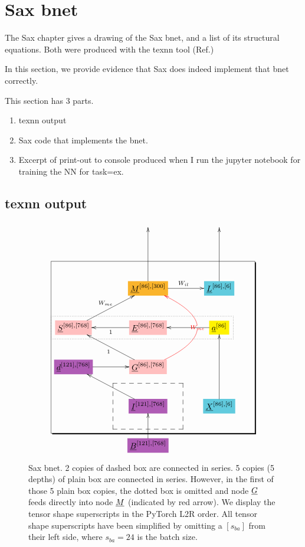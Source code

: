 \documentclass[12pt]{article}
\begin{document}
\section{Sax bnet}

The Sax chapter gives 
a drawing
of the Sax bnet,
and a list
of its structural
equations.
Both were produced with the texnn tool (Ref.\cite{texnn})

In this section,
we provide 
evidence that
 Sax
 does indeed implement
 that bnet correctly.

This section has 3 parts.

\begin{enumerate}

\item texnn output

\item Sax code
that implements the bnet.
\item Excerpt of print-out to console produced when I run
the jupyter notebook for training 
the NN for task=ex. 


\end{enumerate}

\subsection{texnn output}

\begin{figure}[h!]\centering
$$\xymatrix@R=2.5pc@C=3.5pc{
&&
\\
&&
\\
&*+[F*:Dandelion]{\underline{M}^{[86], [300]}}\ar[uu]\ar[r]^{W_{il}}&*+[F*:SkyBlue]{\underline{L}^{[86], [6]}}\ar[uu]
\\
*+[F*:pink]{\underline{S}^{[86], [768]}}\ar[ur]^{W_{me}}&*+[F*:pink]{\underline{E}^{[86], [768]}}\ar[l]^{1}&*+[F*:yellow]{\underline{a}^{[86]}}\ar[l]
\\
*+[F*:Orchid]{\underline{d}^{[121], [768]}}\ar[r]&*+[F*:pink]{\underline{G}^{[86], [768]}}\ar@[red]@/_5pc/[uu]|-{\color{red} W_{me}}\ar[ul]^{1}&
\\
&*+[F*:Orchid]{\underline{I}^{[121], [768]}}\ar[ul]&*+[F*:SkyBlue]{\underline{X}^{[86], [6]}}\ar[uu]
\\
&*+[F*:Orchid]{\underline{B}^{[121], [768]}}\ar[u]&
\save
\POS"3,1"."6,1"."3,3"."6,3"!C*+<4.8em>\frm{-,}
\POS"6,2"."6,2"."6,2"."6,2"!C*+<3.8em>\frm{--}
\POS"4,1"."4,1"."4,3"."4,3"!C*+<1.0em>\frm{.}
\restore
}$$
\caption{Sax bnet. 2 copies of dashed box are connected in series. 5 copies (5 depths) of plain box are connected in series.  However, in the first of those 5 plain box copies, the dotted box  is omitted and node $\underline{G}$ feeds directly into node  $\underline{M}$ (indicated by red arrow). We display the tensor shape superscripts in the PyTorch L2R order. All tensor shape superscripts have been simplified by omitting a $[s_{ba}]$ from their left side, where $s_{ba}=24$ is the batch size. }
\label{fig-texnn-for-sentence-ax-bnet}
\end{figure}
\end{document}
